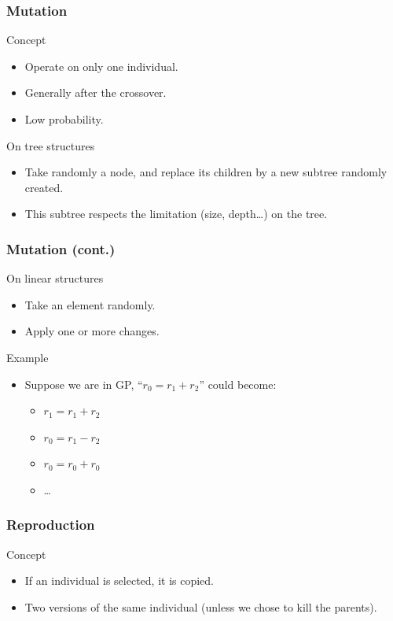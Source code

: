 \begin{frame}
  \frametitle{Mutation}
  \begin{block}{Concept}
    \begin{itemize}
    \item Operate on only one individual.
    \item Generally after the crossover.
    \item Low probability.
    \end{itemize}
  \end{block}

  \begin{block}{On tree structures}
    \begin{itemize}
    \item Take randomly a node, and replace its children by a new subtree
      randomly created.
    \item This subtree respects the limitation (size, depth\dots) on
      the tree.
    \end{itemize}
  \end{block}
\end{frame}

\begin{frame}
  \frametitle{Mutation (cont.)}
  \begin{block}{On linear structures}
    \begin{itemize}
    \item Take an element randomly.
    \item Apply one or more changes.
    \end{itemize}
  \end{block}

  \begin{block}{Example}
    \begin{itemize}
    \item Suppose we are in GP, ``$r_0 = r_1 + r_2$'' could become:
      \begin{itemize}
      \item $r_1 = r_1 + r_2$
      \item $r_0 = r_1 - r_2$
      \item $r_0 = r_0 + r_0$
      \item \dots
      \end{itemize}
    \end{itemize}
  \end{block}
\end{frame}

\begin{frame}
  \frametitle{Reproduction}
  \begin{block}{Concept}
    \begin{itemize}
    \item If an individual is selected, it is copied.
    \item Two versions of the same individual (unless we chose to kill
      the parents).
    \end{itemize}
  \end{block}
\end{frame}

